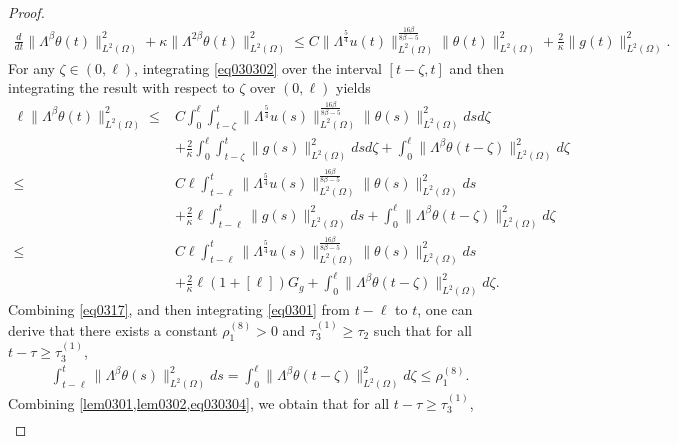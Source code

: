 \documentclass[oneside,preprint,12pt,numbers,sort&compress]{elsarticle}
\begin{document}
\begin{proof}
\begin{align}
  \frac{d}{dt}\|\Lambda^{\beta}\theta(t)\|_{L^2(\Omega)}^2 + \kappa\| \Lambda^{2\beta} \theta(t)\|_{L^2(\Omega)}^2
  \leq C
   \|\Lambda^{\frac{5}{4}}u(t)\|_{L^{2}(\Omega)}^{\frac{16\beta}{8\beta-5}}
   \|\theta(t)\|_{L^{2}(\Omega)}^{2}
   +\frac{2}{\kappa}\|g(t)\|_{L^2(\Omega)}^{2}.
\end{align}
For any $\zeta \in (0, \ell)$, integrating \cref{eq030302} over the interval $[t - \zeta, t]$ and then integrating the result with respect to $\zeta$ over $(0, \ell)$ yields
\begin{equation}\label{eq030303}
\begin{aligned}
  \ell\|\Lambda^{\beta}\theta(t)\|_{L^2(\Omega)}^2 
  \leq&  C
   \int_{0}^{\ell}\int_{t-\zeta}^{t}
   \|\Lambda^{\frac{5}{4}}u(s)\|_{L^{2}(\Omega)}^{\frac{16\beta}{8\beta-5}}
   \|\theta(s)\|_{L^{2}(\Omega)}^{2} ds d\zeta
   \\
   &+\frac{2}{\kappa}\int_{0}^{\ell}\int_{t-\zeta}^{t}\|g(s)\|_{L^2(\Omega)}^{2}  ds d\zeta  +\int_{0}^{\ell}\|\Lambda^{\beta}\theta(t-\zeta)\|_{L^2(\Omega)}^{2}   d\zeta \\
   \leq&  C
   \ell\int_{t-\ell}^{t}
   \|\Lambda^{\frac{5}{4}}u(s)\|_{L^{2}(\Omega)}^{\frac{16\beta}{8\beta-5}}
   \|\theta(s)\|_{L^{2}(\Omega)}^{2} ds
   \\
   &+\frac{2}{\kappa}\ell\int_{t-\ell}^{t}\|g(s)\|_{L^2(\Omega)}^{2}  ds +\int_{0}^{\ell}\|\Lambda^{\beta}\theta(t-\zeta)\|_{L^2(\Omega)}^{2}   d\zeta \\
   \leq&  C
   \ell\int_{t-\ell}^{t}
   \|\Lambda^{\frac{5}{4}}u(s)\|_{L^{2}(\Omega)}^{\frac{16\beta}{8\beta-5}}
   \|\theta(s)\|_{L^{2}(\Omega)}^{2} ds
   \\
   &+\frac{2}{\kappa}\ell(1+[\ell])G_{g} +\int_{0}^{\ell}\|\Lambda^{\beta}\theta(t-\zeta)\|_{L^2(\Omega)}^{2}   d\zeta.
\end{aligned}
\end{equation}
Combining \cref{eq0317}, and then integrating \cref{eq0301} from $t-\ell$ to $t$, one can derive that there exists a constant $\rho_{1}^{(8)}>0$ and $\tau_{3}^{(1)} \geq \tau_{2}$ such that for all $t-\tau \geq \tau_{3}^{(1)}$,
\begin{align}\label{eq030304}
  \int_{t-\ell}^{t} \|\Lambda^\beta \theta(s)\|_{L^2(\Omega)}^2 ds
  =\int_{0}^{\ell} \|\Lambda^\beta \theta(t-\zeta)\|_{L^2(\Omega)}^2 d\zeta
  \leq \rho_{1}^{(8)}.
\end{align}
Combining \cref{lem0301,lem0302,eq030304}, we obtain that for all $t-\tau \geq \tau_{3}^{(1)}$,
\begin{align*}

\end{align*}
\end{proof}
\end{document}
